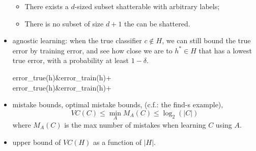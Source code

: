 \documentclass{article}
\begin{document}
\begin{itemize}
		\begin{itemize}
			\item There exists a $d$-sized subset shatterable with arbitrary labels;
			\item There is no subset of size $d+1$ the can be shattered. 
		\end{itemize}
	\item agnostic learning: when the true classifier $c\not\in H$, we can still bound the true
		error by training error, and see how close we are to $h^*\in H$ that has a lowest true error, 
		with a probability at least $1-\delta$.
		\begin{flalign}
			error_{true}(h)&\le error_{train}(h)+ \\
			error_{true}(h)&\le error_{train}(h)+		
		\end{flalign}
	\item mistake bounds, optimal mistake bounds, (c.f.: the find-s example),
		\begin{equation}
			VC(C)\le\min_AM_A(C)\le\log_2(|C|)
		\end{equation}
		where $M_A(C)$ is the max number of mistakes when learning $C$ using $A$. 
	\item upper bound of $VC(H)$ as a function of $|H|$. 
\end{itemize}
\end{document}
